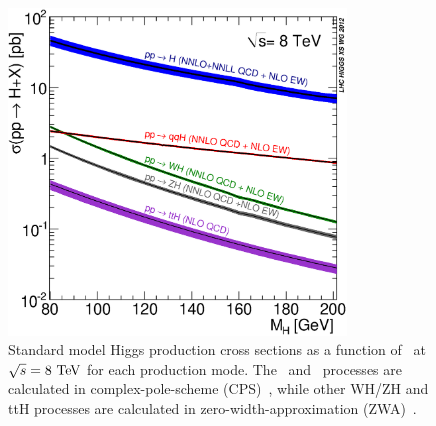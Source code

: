 \begin{figure}[t]
\centering
\includegraphics[width=0.8\textwidth]{figures/Higgs_XS_8TeV_LM200.eps}
\caption{ Standard model Higgs production cross sections 
as a function of \mHi\ at $\sqrt{s}=8~\mathrm{Te\kern -0.1em V}$ for each 
production mode. %
The \ggH\ and \qqH\ processes are 
calculated in complex-pole-scheme (CPS)~\cite{}, while other WH/ZH and ttH processes 
are calculated in zero-width-approximation (ZWA)~\cite{}. }
\label{fig:Higgs_XS_8TeV_LM200}
\end{figure}

